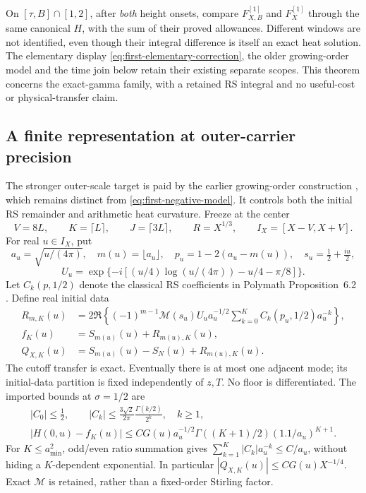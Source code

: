 \documentclass[11pt]{article}
\newcommand{\Mc}{\mathcal M}
\numberwithin{equation}{section}
\begin{document}
On \([\tau,B]\cap[1,2]\), after \emph{both} height onsets, compare
\(F_{X,B}^{[1]}\) and \(F_X^{[1]}\) through the same canonical
\(H\), with the sum of their proved allowances. Different windows
are not identified, even though their integral difference is itself
an exact heat solution. The elementary display
\eqref{eq:first-elementary-correction}, the older growing-order model
and the time join below retain their existing separate scopes.
This theorem concerns the exact-gamma family, with a retained RS
integral and no useful-cost or physical-transfer claim.

\subsection{A finite representation at outer-carrier precision}
The stronger outer-scale target is paid by the earlier growing-order
construction \cite{ansatz05}, which remains distinct from
\eqref{eq:first-negative-model}. It controls both the initial RS
remainder and arithmetic heat curvature. Freeze at the center
\begin{equation}
 V=8L,\qquad K=\lceil L\rceil,\qquad J=\lceil3L\rceil,
 \qquad R=X^{1/3},\qquad I_X=[X-V,X+V].
 \label{eq:negative-orders}
\end{equation}
For real \(u\in I_X\), put
\[
 a_u=\sqrt{u/(4\pi)},\quad m(u)=\lfloor a_u\rfloor,
 \quad p_u=1-2(a_u-m(u)),\quad s_u=\tfrac12+\tfrac{iu}2,
\]
\[
 U_u=\exp\{-i[(u/4)\log(u/(4\pi))-u/4-\pi/8]\}.
\]
Let \(C_k(p,1/2)\) denote the classical RS coefficients in
Polymath Proposition~6.2 \cite{polymath}. Define real initial data
\begin{align}
 R_{m,K}(u)&=2\Re\left\{(-1)^{m-1}\Mc(s_u)U_u a_u^{-1/2}
              \sum_{k=0}^K C_k(p_u,1/2)a_u^{-k}\right\},\\
 f_K(u)&=S_{m(u)}(u)+R_{m(u),K}(u),\\
 Q_{X,K}(u)&=S_{m(u)}(u)-S_N(u)+R_{m(u),K}(u).
 \label{eq:negative-initial-data}
\end{align}
The cutoff transfer is exact. Eventually there is at most one adjacent
mode; its initial-data partition is fixed independently of \(z,T\).
No floor is differentiated. The imported bounds at \(\sigma=1/2\) are
\begin{gather}
 |C_0|\le\tfrac12,\qquad
 |C_k|\le\frac{3\sqrt2}{2\pi}\frac{\Gamma(k/2)}{2^k},\quad k\ge1,
 \label{eq:negative-coefficients}\\
 |H(0,u)-f_K(u)|\le C G(u)a_u^{-1/2}
 \Gamma((K+1)/2)(1.1/a_u)^{K+1}.
 \label{eq:negative-high-order-remainder}
\end{gather}
For \(K\le a_{\min}^2\), odd/even ratio summation gives
\(\sum_{k=1}^K|C_k|a_u^{-k}\le C/a_u\), without hiding a
\(K\)-dependent exponential. In particular
\(|Q_{X,K}(u)|\le C G(u)X^{-1/4}\).
Exact \(\Mc\) is retained, rather than a fixed-order Stirling factor.
\end{document}
